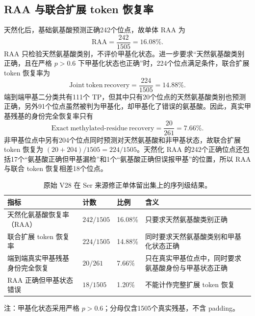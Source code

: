 \subsection{RAA 与联合扩展 token 恢复率}

天然化后，基础氨基酸预测正确242个位点，故单体 RAA 为
\begin{equation}
  \mathrm{RAA}=\frac{242}{1505}=16.08\%.
\end{equation}
RAA 只检验天然氨基酸类别，不评价甲基化状态。进一步要求“天然氨基酸类别正确，且在严格 $p>0.6$ 下甲基化状态也正确”时，224个位点满足条件，联合扩展 token 恢复率为
\begin{equation}
  \mathrm{Joint\ token\ recovery}=\frac{224}{1505}=14.88\%.
\end{equation}
端到端甲基二分类共有111个 TP，但其中只有20个位点的天然氨基酸类别也预测正确，另外91个位点虽然被判为甲基化，却甲基化了错误的氨基酸。因此，真实甲基残基的身份完全恢复率只有
\begin{equation}
  \mathrm{Exact\ methylated\mbox{-}residue\ recovery}=\frac{20}{261}=7.66\%.
\end{equation}
非甲基位点中另有204个位点同时预测对天然氨基酸和非甲基状态，故联合扩展 token 恢复为 $(20+204)/1505=224/1505$。天然化 RAA 的242个正确位点还包括17个“氨基酸正确但甲基漏检”和1个“氨基酸正确但误报甲基”的位置，所以 RAA 与联合 token 恢复相差18个位点。

\begin{table}[H]
  \centering
  \begin{threeparttable}
    \caption{原始 V28 在 Ser 来源修正单体留出集上的序列级结果。}
    \label{tab:monomer-sequence-recovery}
    \begin{tabular}{L{48mm}C{22mm}C{22mm}L{48mm}}
      \toprule
      指标 & 计数 & 比例 & 含义 \\
      \midrule
      天然化氨基酸恢复率（RAA） & $242/1505$ & 16.08\% & 只要求天然氨基酸类别正确 \\
      联合扩展 token 恢复率 & $224/1505$ & 14.88\% & 同时要求天然氨基酸类别和甲基化状态正确 \\
      端到端真实甲基残基身份完全恢复 & $20/261$ & 7.66\% & 只在真实甲基位点中，同时要求氨基酸身份与甲基状态正确 \\
      RAA 正确但甲基状态错误 & $18/1505$ & 1.20\% & 不能计作完整扩展 token 恢复 \\
      \bottomrule
    \end{tabular}
    \begin{tablenotes}[flushleft]\footnotesize
      \item 注：甲基化状态采用严格 $p>0.6$；分母仅含1505个真实残基，不含 padding。
    \end{tablenotes}
  \end{threeparttable}
\end{table}

